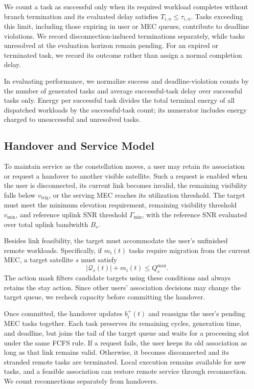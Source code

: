 \documentclass[journal]{IEEEtran}
\begin{document}
We count a task as successful only when its required
workload completes without branch termination and its
evaluated delay satisfies $T_{i,n}\leq\tau_{i,n}$.
Tasks exceeding this limit, including those expiring
in user or MEC queues, contribute to deadline violations.
We record disconnection-induced terminations separately,
while tasks unresolved at the evaluation horizon remain
pending. For an expired or terminated task, we record
its outcome rather than assign a normal completion delay.

In evaluating performance, we normalize success and
deadline-violation counts by the number of generated
tasks and average successful-task delay over successful
tasks only. Energy per successful task divides the
total terminal energy of all dispatched workloads by
the successful-task count; its numerator includes
energy charged to unsuccessful and unresolved tasks.

\subsection{Handover and Service Model}
\label{subsec:handover_model}

To maintain service as the constellation moves, a user
may retain its association or request a handover to
another visible satellite. Such a request is enabled
when the user is disconnected, its current link becomes
invalid, the remaining visibility falls below
$v_{\mathrm{trig}}$, or the serving MEC reaches its
utilization threshold. The target must meet the minimum
elevation requirement, remaining visibility threshold
$v_{\min}$, and reference uplink SNR threshold
$\Gamma_{\min}$, with the reference SNR evaluated
over total uplink bandwidth $B_s$.

Besides link feasibility, the target must accommodate
the user's unfinished remote workloads. Specifically,
if $m_i(t)$ tasks require migration from the current
MEC, a target satellite $s$ must satisfy
\begin{equation}
|\mathcal{Q}_s(t)|+m_i(t)\leq Q_s^{\max}.
\label{eq:migration_capacity}
\end{equation}
The action mask filters candidate targets using these
conditions and always retains the stay action.
Since other users' association decisions may change
the target queue, we recheck capacity before committing
the handover.

Once committed, the handover updates $b_i^{+}(t)$
and reassigns the user's pending MEC tasks together.
Each task preserves its remaining cycles, generation
time, and deadline, but joins the tail of the target
queue and waits for a processing slot under the same
FCFS rule. If a request fails, the user keeps its old
association as long as that link remains valid.
Otherwise, it becomes disconnected and its stranded
remote tasks are terminated. Local execution remains
available for new tasks, and a feasible association
can restore remote service through reconnection.
We count reconnections separately from handovers.
\end{document}
